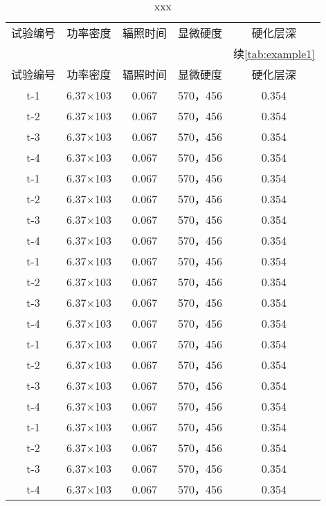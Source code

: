 \documentclass[../../main.tex]{subfiles}
\begin{document}
\begin{longtable}{ccccc}
\label{tab:example1} \\
\caption{xxx} \\
\toprule
试验编号 & 功率密度 & 辐照时间 & 显微硬度       & 硬化层深\\ 
\midrule
\endfirsthead


&&&& 续\autoref{tab:example1}\\
\hline
试验编号 & 功率密度 & 辐照时间 & 显微硬度       & 硬化层深\\ 
\midrule
\endhead

\hline
\endfoot
\bottomrule
\endlastfoot
t-1     &6.37×103       &0.067  &570，456        &0.354\\
t-2     &6.37×103       &0.067  &570，456        &0.354\\
t-3     &6.37×103       &0.067  &570，456        &0.354\\
t-4     &6.37×103       &0.067  &570，456        &0.354\\
t-1     &6.37×103       &0.067  &570，456        &0.354\\
t-2     &6.37×103       &0.067  &570，456        &0.354\\
t-3     &6.37×103       &0.067  &570，456        &0.354\\
t-4     &6.37×103       &0.067  &570，456        &0.354\\
t-1     &6.37×103       &0.067  &570，456        &0.354\\
t-2     &6.37×103       &0.067  &570，456        &0.354\\
t-3     &6.37×103       &0.067  &570，456        &0.354\\
t-4     &6.37×103       &0.067  &570，456        &0.354\\
t-1     &6.37×103       &0.067  &570，456        &0.354\\
t-2     &6.37×103       &0.067  &570，456        &0.354\\
t-3     &6.37×103       &0.067  &570，456        &0.354\\
t-4     &6.37×103       &0.067  &570，456        &0.354\\
t-1     &6.37×103       &0.067  &570，456        &0.354\\
t-2     &6.37×103       &0.067  &570，456        &0.354\\
t-3     &6.37×103       &0.067  &570，456        &0.354\\
t-4     &6.37×103       &0.067  &570，456        &0.354\\

\end{longtable}
\end{document}
